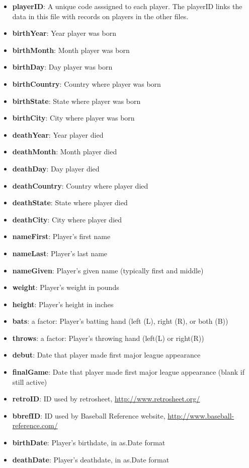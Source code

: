 \documentclass[]{book}
\providecommand{\tightlist}{%
  \setlength{\itemsep}{0pt}\setlength{\parskip}{0pt}}
\theoremstyle{definition}
\theoremstyle{definition}
\theoremstyle{definition}
\theoremstyle{remark}
\begin{document}
\begin{itemize}
\tightlist
\item
  \textbf{playerID}: A unique code asssigned to each player. The
  playerID links the data in this file with records on players in the
  other files.
\item
  \textbf{birthYear}: Year player was born
\item
  \textbf{birthMonth}: Month player was born
\item
  \textbf{birthDay}: Day player was born
\item
  \textbf{birthCountry}: Country where player was born
\item
  \textbf{birthState}: State where player was born
\item
  \textbf{birthCity}: City where player was born
\item
  \textbf{deathYear}: Year player died
\item
  \textbf{deathMonth}: Month player died
\item
  \textbf{deathDay}: Day player died
\item
  \textbf{deathCountry}: Country where player died
\item
  \textbf{deathState}: State where player died
\item
  \textbf{deathCity}: City where player died
\item
  \textbf{nameFirst}: Player's first name
\item
  \textbf{nameLast}: Player's last name
\item
  \textbf{nameGiven}: Player's given name (typically first and middle)
\item
  \textbf{weight}: Player's weight in pounds
\item
  \textbf{height}: Player's height in inches
\item
  \textbf{bats}: a factor: Player's batting hand (left (L), right (R),
  or both (B))
\item
  \textbf{throws}: a factor: Player's throwing hand (left(L) or
  right(R))
\item
  \textbf{debut}: Date that player made first major league appearance
\item
  \textbf{finalGame}: Date that player made first major league
  appearance (blank if still active)
\item
  \textbf{retroID}: ID used by retrosheet,
  \url{http://www.retrosheet.org/}
\item
  \textbf{bbrefID}: ID used by Baseball Reference website,
  \url{http://www.baseball-reference.com/}
\item
  \textbf{birthDate}: Player's birthdate, in as.Date format
\item
  \textbf{deathDate}: Player's deathdate, in as.Date format
\end{itemize}
\end{document}
